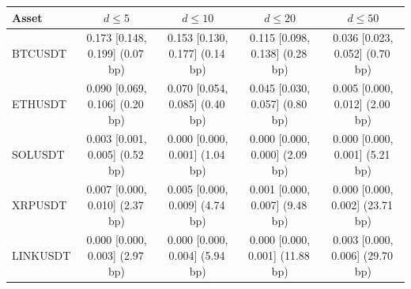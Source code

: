 \begin{tabular}{lcccc}
\toprule
Asset & $d \le 5$ & $d \le 10$ & $d \le 20$ & $d \le 50$ \\
\midrule
BTCUSDT & 0.173 {\scriptsize[0.148, 0.199]} {\scriptsize(0.07\,bp)} & 0.153 {\scriptsize[0.130, 0.177]} {\scriptsize(0.14\,bp)} & 0.115 {\scriptsize[0.098, 0.138]} {\scriptsize(0.28\,bp)} & 0.036 {\scriptsize[0.023, 0.052]} {\scriptsize(0.70\,bp)} \\
ETHUSDT & 0.090 {\scriptsize[0.069, 0.106]} {\scriptsize(0.20\,bp)} & 0.070 {\scriptsize[0.054, 0.085]} {\scriptsize(0.40\,bp)} & 0.045 {\scriptsize[0.030, 0.057]} {\scriptsize(0.80\,bp)} & 0.005 {\scriptsize[0.000, 0.012]} {\scriptsize(2.00\,bp)} \\
SOLUSDT & 0.003 {\scriptsize[0.001, 0.005]} {\scriptsize(0.52\,bp)} & 0.000 {\scriptsize[0.000, 0.001]} {\scriptsize(1.04\,bp)} & 0.000 {\scriptsize[0.000, 0.000]} {\scriptsize(2.09\,bp)} & 0.000 {\scriptsize[0.000, 0.001]} {\scriptsize(5.21\,bp)} \\
XRPUSDT & 0.007 {\scriptsize[0.000, 0.010]} {\scriptsize(2.37\,bp)} & 0.005 {\scriptsize[0.000, 0.009]} {\scriptsize(4.74\,bp)} & 0.001 {\scriptsize[0.000, 0.007]} {\scriptsize(9.48\,bp)} & 0.000 {\scriptsize[0.000, 0.002]} {\scriptsize(23.71\,bp)} \\
LINKUSDT & 0.000 {\scriptsize[0.000, 0.003]} {\scriptsize(2.97\,bp)} & 0.000 {\scriptsize[0.000, 0.004]} {\scriptsize(5.94\,bp)} & 0.000 {\scriptsize[0.000, 0.001]} {\scriptsize(11.88\,bp)} & 0.003 {\scriptsize[0.000, 0.006]} {\scriptsize(29.70\,bp)} \\
\bottomrule
\end{tabular}
